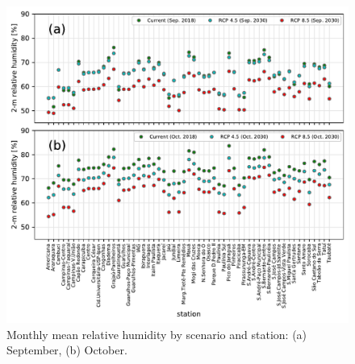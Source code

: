  \begin{figure}[hbt]
  \includegraphics[width=1\textwidth]{fig/rh_sep_oct.pdf}
  \caption{Monthly mean relative humidity by scenario and station: (a) September, (b) October.}
  \label{fig:rh_scen}
\end{figure}

